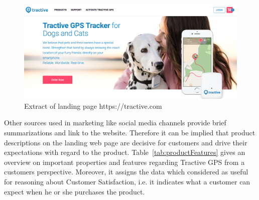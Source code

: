 \begin{figure}
	\centering
	\includegraphics[width=1.0\textwidth]{img/tractiveLanding.png}
	\caption{Extract of landing page https://tractive.com}
	\label{fig:tractiveLanding}
\end{figure} 

Other sources used in marketing like social media channels provide brief summarizations and link to the website. Therefore it can be implied that product descriptions on the landing web page are decisive for customers and drive their expectations with regard to the product. Table~\ref{tab:productFeatures} gives an overview on important properties and features regarding Tractive GPS from a customers perspective. Moreover, it assigns the data which considered as useful for reasoning about Customer Satisfaction, i.e. it indicates what a customer can expect when he or she purchases the product.


